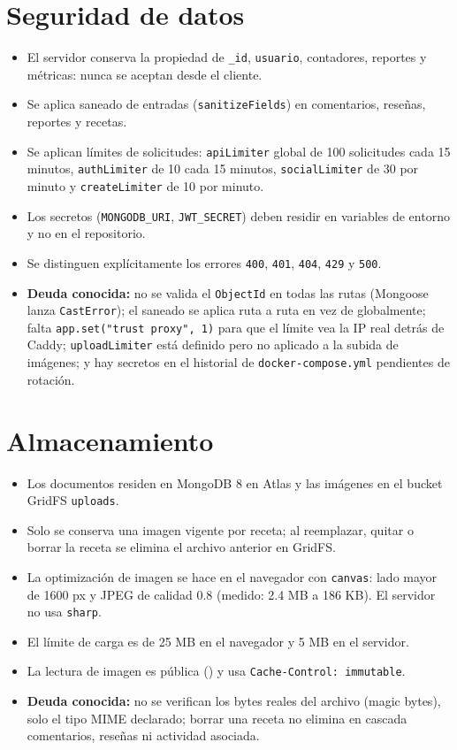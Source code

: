 \section{Seguridad de datos}

\begin{itemize}[leftmargin=*]
  \item El servidor conserva la propiedad de \texttt{\_id}, \texttt{usuario}, contadores, reportes y métricas: nunca se aceptan desde el cliente.
  \item Se aplica saneado de entradas (\texttt{sanitizeFields}) en comentarios, reseñas, reportes y recetas.
  \item Se aplican límites de solicitudes: \texttt{apiLimiter} global de 100 solicitudes cada 15 minutos, \texttt{authLimiter} de 10 cada 15 minutos, \texttt{socialLimiter} de 30 por minuto y \texttt{createLimiter} de 10 por minuto.
  \item Los secretos (\texttt{MONGODB\_URI}, \texttt{JWT\_SECRET}) deben residir en variables de entorno y no en el repositorio.
  \item Se distinguen explícitamente los errores \texttt{400}, \texttt{401}, \texttt{404}, \texttt{429} y \texttt{500}.
  \item \textbf{Deuda conocida:} no se valida el \texttt{ObjectId} en todas las rutas (Mongoose lanza \texttt{CastError}); el saneado se aplica ruta a ruta en vez de globalmente; falta \texttt{app.set("trust proxy", 1)} para que el límite vea la IP real detrás de Caddy; \texttt{uploadLimiter} está definido pero no aplicado a la subida de imágenes; y hay secretos en el historial de \texttt{docker-compose.yml} pendientes de rotación.
\end{itemize}

\section{Almacenamiento}

\begin{itemize}[leftmargin=*]
  \item Los documentos residen en MongoDB 8 en Atlas y las imágenes en el bucket GridFS \texttt{uploads}.
  \item Solo se conserva una imagen vigente por receta; al reemplazar, quitar o borrar la receta se elimina el archivo anterior en GridFS.
  \item La optimización de imagen se hace en el navegador con \texttt{canvas}: lado mayor de 1600 px y JPEG de calidad 0.8 (medido: 2.4 MB a 186 KB). El servidor no usa \texttt{sharp}.
  \item El límite de carga es de 25 MB en el navegador y 5 MB en el servidor.
  \item La lectura de imagen es pública () y usa \texttt{Cache-Control: immutable}.
  \item \textbf{Deuda conocida:} no se verifican los bytes reales del archivo (magic bytes), solo el tipo MIME declarado; borrar una receta no elimina en cascada comentarios, reseñas ni actividad asociada.
\end{itemize}

